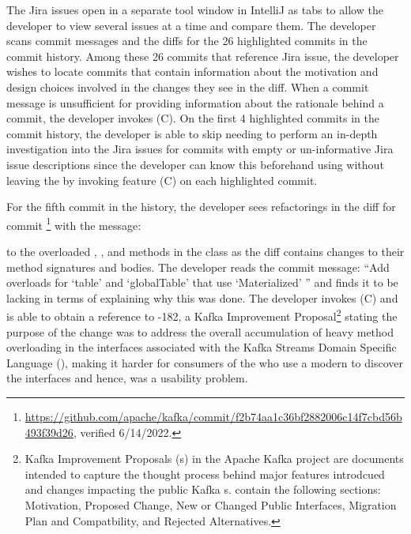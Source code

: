 The Jira issues open in a separate tool window in IntelliJ as tabs to allow the developer to view several issues at a time and compare them.
The developer scans commit messages and the diffs for the 26 highlighted commits in the  commit history.
Among these 26 commits that reference Jira issue, the developer wishes to locate commits that contain information about the motivation and design choices involved in the changes they see in the diff.
When a commit message is unsufficient for providing information about the rationale behind a commit, the developer invokes (C).
On the first 4 highlighted commits in the commit history, the developer is able to skip needing to perform an in-depth investigation into the Jira issues for commits with empty or un-informative Jira issue descriptions since the developer can know this beforehand using without leaving the  by invoking feature (C) on each highlighted commit.

For the fifth commit in the history, the developer sees refactorings in the diff for commit \footnote{\url{https://github.com/apache/kafka/commit/f2b74aa1c36bf2882006c14f7cbd56b493f39d26}, verified 6/14/2022.} with the message:

\begin{center}
\end{center}

to the overloaded , , and  methods in the  class as the diff contains changes to their method signatures and bodies.
The developer reads the commit message: ``Add overloads for `table' and `globalTable' that use `Materialized' '' and finds it to be lacking in terms of explaining why this was done.
The developer invokes (C) and is able to obtain a reference to -182, a Kafka Improvement Proposal\footnote{Kafka Improvement Proposals (s) in the Apache Kafka project are documents intended to capture the thought process behind major features introdcued and changes impacting the public Kafka s.  contain the following sections: Motivation, Proposed Change, New or Changed Public Interfaces, Migration Plan and Compatbility, and Rejected Alternatives.} stating the purpose of the change was to address the overall accumulation of heavy method overloading in the interfaces associated with the Kafka Streams Domain Specific Language (), making it harder for consumers of the  who use a modern  to discover the interfaces and hence, was a usability problem.

